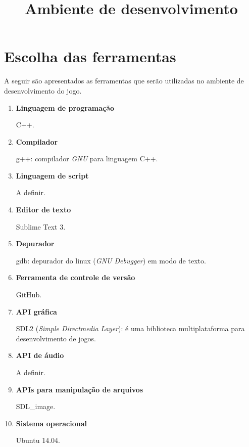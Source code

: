 \documentclass[a4paper, 11pt]{article} %
\title{\textbf{Ambiente de desenvolvimento}} %
\makeatletter
\renewcommand{\maketitle}{ %
\begin{center} %
{\LARGE\@title} %

\vspace{20pt} %

\end{center}
}
\makeatother
\begin{document}
\maketitle %


\section*{Escolha das ferramentas}

A seguir são apresentados as ferramentas que serão utilizadas no ambiente de desenvolvimento do jogo.

\begin{enumerate}
\item \textbf{Linguagem de programação}

C++.
\item \textbf{Compilador}

g++: compilador \textit{GNU} para linguagem C++.
\item \textbf{Linguagem de script}

A definir.
\item \textbf{Editor de texto}

Sublime Text 3.
\item \textbf{Depurador}

gdb: depurador do linux (\textit{GNU Debugger}) em modo de texto.
\item \textbf{Ferramenta de controle de versão}

GitHub.
\item \textbf{API gráfica}

SDL2 (\textit{Simple Directmedia Layer}): é uma biblioteca multiplataforma para desenvolvimento de jogos.
\item \textbf{API de áudio}

A definir.
\item \textbf{APIs para manipulação de arquivos}

SDL_image.
\item \textbf{Sistema operacional}

Ubuntu 14.04.

\end{enumerate}
\end{document}
